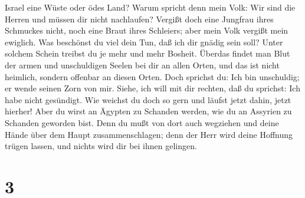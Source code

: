 Israel eine Wüste oder ödes Land? Warum spricht denn mein Volk: Wir sind
die Herren und müssen dir nicht nachlaufen?  Vergißt doch
eine Jungfrau ihres Schmuckes nicht, noch eine Braut ihres Schleiers;
aber mein Volk vergißt mein ewiglich.  Was beschönst du
viel dein Tun, daß ich dir gnädig sein soll? Unter solchem Schein
treibst du je mehr und mehr Bosheit.  Überdas findet man
Blut der armen und unschuldigen Seelen bei dir an allen Orten, und das
ist nicht heimlich, sondern offenbar an diesen Orten.  Doch
sprichst du: Ich bin unschuldig; er wende seinen Zorn von mir. Siehe,
ich will mit dir rechten, daß du sprichst: Ich habe nicht gesündigt.
 Wie weichst du doch so gern und läufst jetzt dahin, jetzt
hierher! Aber du wirst an Ägypten zu Schanden werden, wie du an Assyrien
zu Schanden geworden bist.  Denn du mußt von dort auch
wegziehen und deine Hände über dem Haupt zusammenschlagen; denn der Herr
wird deine Hoffnung trügen lassen, und nichts wird dir bei ihnen
gelingen.

\hypertarget{section-2}{%
\section{3}\label{section-2}}

